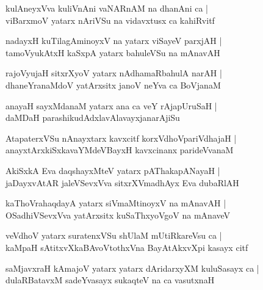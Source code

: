 \documentclass[twoside,12pt,openright]{book}
\newcounter{shloka}[chapter]
\begin{document}
\begin{shloka}%
kulAneyxVva kuliVnAni vaNARnAM na dhanAni ca |\\
viBarxmoV yatarx nAriVSu na vidavxtusx ca kahiRvitf 
\end{shloka}

\begin{shloka}%
nadayxH kuTilagAminoyxV na yatarx viSayeV parxjAH |\\
tamoVyukAtxH kaSxpA yatarx  bahuleVSu na mAnavAH 
\end{shloka}

\begin{shloka}%
rajoVyujaH sitxrXyoV yatarx nAdhamaRbahulA narAH |\\
dhaneYranaMdoV yatArxsitx janoV neYva ca BoVjanaM 
\end{shloka}

\begin{shloka}%
anayaH sayxMdanaM yatarx ana ca veY rAjapUruSaH |\\
daMDaH parashikudAdxlavAlavayxjanarAjiSu
\end{shloka}

\begin{shloka}%
AtapaterxVSu nAnayxtarx kavxcitf korxVdhoVpariVdhajaH |\\
anayxtArxkiSxkavaYMdeVBayxH kavxcinanx parideVvanaM 
\end{shloka}

\begin{shloka}%
AkiSxkA Eva daqshayxMteV yatarx pAThakapANayaH |\\
jaDayxvAtAR jaleVSevxVva sitxrXVmadhAyx Eva dubaRlAH 
\end{shloka}

\begin{shloka}%
kaThoVrahaqdayA yatarx siVmaMtinoyxV na mAnavAH |\\
OSadhiVSevxVva yatArxsitx kuSaThxyoVgoV na mAnaveV
\end{shloka}

\begin{shloka}%
veVdhoV yatarx suratenxVSu shUlaM mUtiRkareVsu ca |\\
kaMpaH sAtitxvXkaBAvoVtothxVna BayAtAkxvXpi kasayx citf  
\end{shloka}

\begin{shloka}%
saMjavxraH kAmajoV yatarx yatarx dAridarxyXM kuluSasayx ca |\\
dulaRBatavxM sadeYvasayx sukaqteV na ca vasutxnaH 
\end{shloka}
\end{document}
